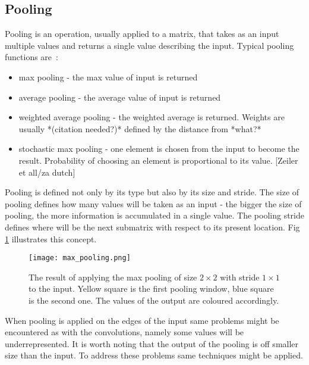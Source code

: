 \documentclass[a4paper,10pt]{report}
\begin{document}
	
	\subsection{Pooling}
	  Pooling is an operation, usually applied to a matrix, that takes as an input multiple values and returns a single value describing the input. Typical pooling functions are~\cite{BENGIOBOOK, DUTCH}:
	  \begin{itemize}
	    \item max pooling - the max value of input is returned
	    \item average pooling - the average value of input is returned
	    \item weighted average pooling - the weighted average is returned. Weights are usually *(citation needed?)* defined by the distance from *what?* %
	    \item stochastic max pooling - one element is chosen from the input to become the result. Probability of choosing an element is proportional to its value. [Zeiler et all/za dutch]\\
	  \end{itemize}
	  
	  
	  Pooling is defined not only by its type but also by its size and stride. The size of pooling defines how many values will be taken as an input - the bigger the size of pooling, the more information is accumulated in a single value. The pooling stride defines where will be the next submatrix with respect to its present location. Fig \ref{fig:max_pooling} illustrates this concept.\\
	  
	  \begin{figure}[h!]
	    \centering
	    \texttt{[image: max\_pooling.png]}
	    \caption{The result of applying the max pooling of size $2\times2$ with stride $1\times1$ to the input. Yellow square is the first pooling window, blue square is the second one. The values of the output are coloured accordingly.}
	    \label{fig:max_pooling}
	  \end{figure} 
  
	  When pooling is applied on the edges of the input same problems might be encountered as with the convolutions, namely some values will be underrepresented. It is worth noting that the output of the pooling is off smaller size than the input. To address these problems same techniques might be applied.\\
	  
\end{document}
